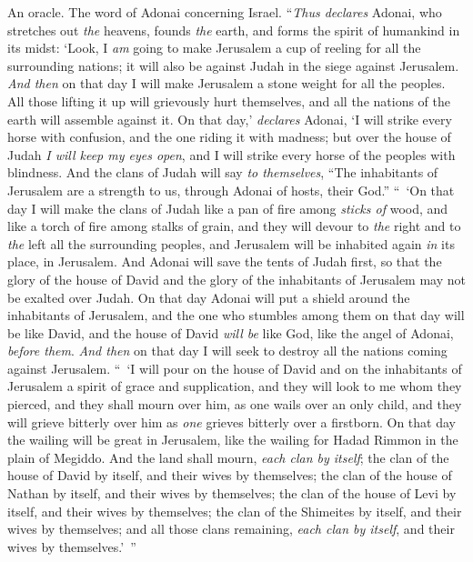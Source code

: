 \begin{biblechapter} %
 An oracle. The word of Adonai concerning Israel. “\textit{Thus declares} Adonai, who stretches out \textit{the} heavens, founds \textit{the} earth, and forms the spirit of humankind in its midst:
\verse ‘Look, I \textit{am} going to make Jerusalem a cup of reeling for all the surrounding nations; it will also be against Judah in the siege against Jerusalem.
\verse \textit{And then} on that day I will make Jerusalem a stone weight for all the peoples. All those lifting it up will grievously hurt themselves, and all the nations of the earth will assemble against it.
\verse On that day,’ \textit{declares} Adonai, ‘I will strike every horse with confusion, and the one riding it with madness; but over the house of Judah \textit{I will keep my eyes open}, and I will strike every horse of the peoples with blindness.
\verse And the clans of Judah will say \textit{to themselves}, “The inhabitants of Jerusalem are a strength to us, through Adonai of hosts, their God.”
\verse “ ‘On that day I will make the clans of Judah like a pan of fire among \textit{sticks of} wood, and like a torch of fire among stalks of grain, and they will devour to \textit{the} right and to \textit{the} left all the surrounding peoples, and Jerusalem will be inhabited again \textit{in} its place, in Jerusalem.
\verse And Adonai will save the tents of Judah first, so that the glory of the house of David and the glory of the inhabitants of Jerusalem may not be exalted over Judah.
\verse On that day Adonai will put a shield around the inhabitants of Jerusalem, and the one who stumbles among them on that day will be like David, and the house of David \textit{will be} like God, like the angel of Adonai, \textit{before them}.
\verse \textit{And then} on that day I will seek to destroy all the nations coming against Jerusalem.
\verse “ ‘I will pour on the house of David and on the inhabitants of Jerusalem a spirit of grace and supplication, and they will look to me whom they pierced, and they shall mourn over him, as one wails over an only child, and they will grieve bitterly over him as \textit{one} grieves bitterly over a firstborn.
\verse On that day the wailing will be great in Jerusalem, like the wailing for Hadad Rimmon in the plain of Megiddo.
\verse And the land shall mourn, \textit{each clan by itself}; the clan of the house of David by itself, and their wives by themselves; the clan of the house of Nathan by itself, and their wives by themselves;
\verse the clan of the house of Levi by itself, and their wives by themselves; the clan of the Shimeites by itself, and their wives by themselves;
\verse and all those clans remaining, \textit{each clan by itself}, and their wives by themselves.’ ”
\end{biblechapter}


